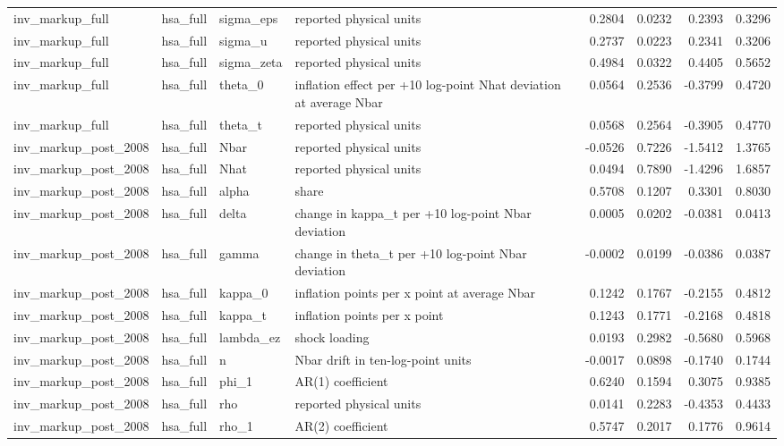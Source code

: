 \begin{tabular}{llllrrrr}
inv\_markup\_full & hsa\_full & sigma\_eps & reported physical units & 0.2804 & 0.0232 & 0.2393 & 0.3296 \\
inv\_markup\_full & hsa\_full & sigma\_u & reported physical units & 0.2737 & 0.0223 & 0.2341 & 0.3206 \\
inv\_markup\_full & hsa\_full & sigma\_zeta & reported physical units & 0.4984 & 0.0322 & 0.4405 & 0.5652 \\
inv\_markup\_full & hsa\_full & theta\_0 & inflation effect per +10 log-point Nhat deviation at average Nbar & 0.0564 & 0.2536 & -0.3799 & 0.4720 \\
inv\_markup\_full & hsa\_full & theta\_t & reported physical units & 0.0568 & 0.2564 & -0.3905 & 0.4770 \\
inv\_markup\_post\_2008 & hsa\_full & Nbar & reported physical units & -0.0526 & 0.7226 & -1.5412 & 1.3765 \\
inv\_markup\_post\_2008 & hsa\_full & Nhat & reported physical units & 0.0494 & 0.7890 & -1.4296 & 1.6857 \\
inv\_markup\_post\_2008 & hsa\_full & alpha & share & 0.5708 & 0.1207 & 0.3301 & 0.8030 \\
inv\_markup\_post\_2008 & hsa\_full & delta & change in kappa\_t per +10 log-point Nbar deviation & 0.0005 & 0.0202 & -0.0381 & 0.0413 \\
inv\_markup\_post\_2008 & hsa\_full & gamma & change in theta\_t per +10 log-point Nbar deviation & -0.0002 & 0.0199 & -0.0386 & 0.0387 \\
inv\_markup\_post\_2008 & hsa\_full & kappa\_0 & inflation points per x point at average Nbar & 0.1242 & 0.1767 & -0.2155 & 0.4812 \\
inv\_markup\_post\_2008 & hsa\_full & kappa\_t & inflation points per x point & 0.1243 & 0.1771 & -0.2168 & 0.4818 \\
inv\_markup\_post\_2008 & hsa\_full & lambda\_ez & shock loading & 0.0193 & 0.2982 & -0.5680 & 0.5968 \\
inv\_markup\_post\_2008 & hsa\_full & n & Nbar drift in ten-log-point units & -0.0017 & 0.0898 & -0.1740 & 0.1744 \\
inv\_markup\_post\_2008 & hsa\_full & phi\_1 & AR(1) coefficient & 0.6240 & 0.1594 & 0.3075 & 0.9385 \\
inv\_markup\_post\_2008 & hsa\_full & rho & reported physical units & 0.0141 & 0.2283 & -0.4353 & 0.4433 \\
inv\_markup\_post\_2008 & hsa\_full & rho\_1 & AR(2) coefficient & 0.5747 & 0.2017 & 0.1776 & 0.9614 \\

\end{tabular}
